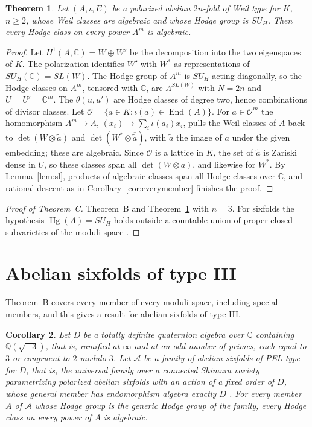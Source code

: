 \documentclass[11pt]{amsart}
\newtheorem{theorem}{Theorem}[section]
\newtheorem{corollary}[theorem]{Corollary}
\theoremstyle{definition}
\theoremstyle{remark}
\newcommand{\Q}{\mathbb Q}
\newcommand{\C}{\mathbb C}
\newcommand{\End}{\operatorname{End}}
\newcommand{\Hg}{\operatorname{Hg}}
\begin{document}
\begin{theorem}\label{thm:powers}
Let $(A,\iota,E)$ be a polarized abelian $2n$-fold of Weil type for $K$, $n\ge2$, whose Weil classes are algebraic and whose Hodge group is $SU_H$. Then every Hodge class on every power $A^m$ is algebraic.
\end{theorem}

\begin{proof}
Let $H^1(A,\C)=W\oplus W'$ be the decomposition into the two eigenspaces of $K$. The polarization identifies $W'$ with $W^*$ as representations of $SU_H(\C)=SL(W)$. The Hodge group of $A^m$ is $SU_H$ acting diagonally, so the Hodge classes on $A^m$, tensored with $\C$, are $\Lambda^{SL(W)}$ with $N=2n$ and $U=U'=\C^m$. The $\theta(u,u')$ are Hodge classes of degree two, hence combinations of divisor classes. Let $\mathcal O=\{a\in K:\iota(a)\in\End(A)\}$. For $a\in\mathcal O^m$ the homomorphism $A^m\to A$, $(x_i)\mapsto\sum_i\iota(a_i)x_i$, pulls the Weil classes of $A$ back to $\det(W\otimes\tilde a)$ and $\det(W^*\otimes\overline{\tilde a})$, with $\tilde a$ the image of $a$ under the given embedding; these are algebraic. Since $\mathcal O$ is a lattice in $K$, the set of $\tilde a$ is Zariski dense in $U$, so these classes span all $\det(W\otimes a)$, and likewise for $W^*$. By Lemma~\ref{lem:sl}, products of algebraic classes span all Hodge classes over $\C$, and rational descent as in Corollary~\ref{cor:everymember} finishes the proof.
\end{proof}

\begin{proof}[Proof of Theorem~C]
Theorem~B and Theorem~\ref{thm:powers} with $n=3$. For sixfolds the hypothesis $\Hg(A)=SU_H$ holds outside a countable union of proper closed subvarieties of the moduli space \cite[Theorem~6.11]{vanGeemen}.
\end{proof}

\section{Abelian sixfolds of type III}\label{sec:typeIII}

Theorem~B covers every member of every moduli space, including special members, and this gives a result for abelian sixfolds of type III.

\begin{corollary}\label{cor:typeIII}
Let $D$ be a totally definite quaternion algebra over $\Q$ containing $\Q(\sqrt{-3})$, that is, ramified at $\infty$ and at an odd number of primes, each equal to $3$ or congruent to $2$ modulo $3$. Let $\mathcal A$ be a family of abelian sixfolds of PEL type for $D$, that is, the universal family over a connected Shimura variety parametrizing polarized abelian sixfolds with an action of a fixed order of $D$, whose general member has endomorphism algebra exactly $D$ \cite[\S2.5]{Abdulali}. For every member $A$ of $\mathcal A$ whose Hodge group is the generic Hodge group of the family, every Hodge class on every power of $A$ is algebraic.
\end{corollary}
\end{document}
